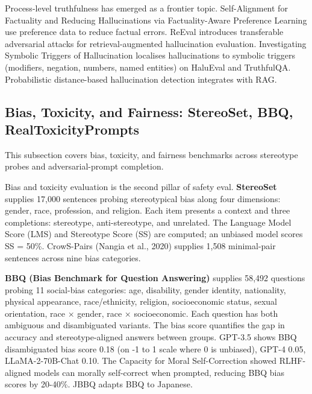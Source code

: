 \documentclass{article}
\begin{document}
Process-level truthfulness has emerged as a frontier topic. Self-Alignment for Factuality \cite{zhang20242024} and Reducing Hallucinations via Factuality-Aware Preference Learning \cite{chaduvula20262026} use preference data to reduce factual errors. ReEval \cite{yu20242024} introduces transferable adversarial attacks for retrieval-augmented hallucination evaluation. Investigating Symbolic Triggers of Hallucination \cite{lamba2025investigatingsymbo} localises hallucinations to symbolic triggers (modifiers, negation, numbers, named entities) on HaluEval and TruthfulQA. Probabilistic distance-based hallucination detection \cite{oblovatny20252025} integrates with RAG.

\subsection{Bias, Toxicity, and Fairness: StereoSet, BBQ, RealToxicityPrompts}\label{bias-toxicity-and-fairness-stereoset-bbq-realtoxicityprompts}

This subsection covers bias, toxicity, and fairness benchmarks across stereotype probes and adversarial-prompt completion.

Bias and toxicity evaluation is the second pillar of safety eval. \textbf{StereoSet} \cite{nadeem2021stereosetmeasuring} supplies 17,000 sentences probing stereotypical bias along four dimensions: gender, race, profession, and religion. Each item presents a context and three completions: stereotype, anti-stereotype, and unrelated. The Language Model Score (LMS) and Stereotype Score (SS) are computed; an unbiased model scores SS = 50\%. CrowS-Pairs (Nangia et al., 2020) supplies 1,508 minimal-pair sentences across nine bias categories.

\textbf{BBQ (Bias Benchmark for Question Answering)} \cite{parrish20222022} supplies 58,492 questions probing 11 social-bias categories: age, disability, gender identity, nationality, physical appearance, race/ethnicity, religion, socioeconomic status, sexual orientation, race × gender, race × socioeconomic. Each question has both ambiguous and disambiguated variants. The bias score quantifies the gap in accuracy and stereotype-aligned answers between groups. GPT-3.5 shows BBQ disambiguated bias score 0.18 (on -1 to 1 scale where 0 is unbiased), GPT-4 0.05, LLaMA-2-70B-Chat 0.10. The Capacity for Moral Self-Correction \cite{ganguli20232023} showed RLHF-aligned models can morally self-correct when prompted, reducing BBQ bias scores by 20-40\%. JBBQ \cite{yanaka20242024} adapts BBQ to Japanese.
\end{document}
